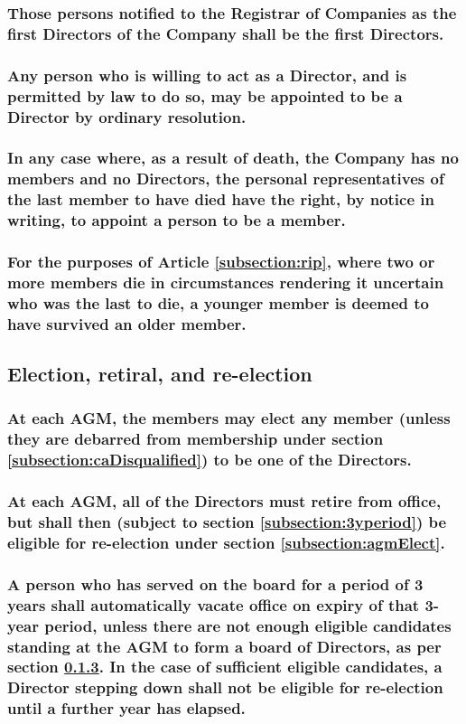 \documentclass[12pt]{article}
\begin{document}
\subsubsection{Those persons notified to the Registrar of Companies as the first Directors of the Company shall be the first Directors.}
\subsubsection{Any person who is willing to act as a Director, and is permitted by law to do so, may be appointed to be a Director by ordinary resolution.}
\subsubsection{\label{subsection:rip}In any case where, as a result of death, the Company has no members and no Directors, the personal representatives of the last member to have died have the right, by notice in writing, to appoint a person to be a member.}
\subsubsection{For the purposes of Article \ref{subsection:rip}, where two or more members die in circumstances rendering it uncertain who was the last to die, a younger member is deemed to have survived an older member.}

\subsection{Election, retiral, and re-election}
\subsubsection{\label{subsection:agmElect}At each AGM, the members may elect any member (unless they are debarred from
membership under section \ref{subsection:caDisqualified}) to be one of the Directors.}
\subsubsection{At each AGM, all of the Directors must retire from office, but shall then (subject to section \ref{subsection:3yperiod}) be eligible for re-election under section \ref{subsection:agmElect}.}
\subsubsection{\label{subsection:3yperiod}A person who has served on the board for a period of 3 years shall automatically vacate office on expiry of that 3-year period, unless there are not enough eligible candidates standing at the AGM to form a board of Directors, as per section \ref{}. In the case of sufficient eligible candidates, a Director stepping down shall not be eligible for re-election until a further year has elapsed.}
\end{document}
